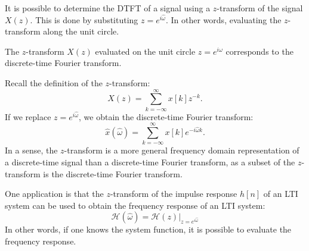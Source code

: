 It is possible to determine the DTFT of a signal using a $z$-transform
of the signal $X(z)$. This is done by substituting
$z=e^{i\hat{\omega}}$. In other words, evaluating the $z$-transform
along the unit circle.

\begin{marginfigure}
  \begin{center}
  \end{center}
  \caption{The $z$-transform $X(z)$ evaluated on the unit circle $z=e^{i\hat{\omega}}$ corresponds to the discrete-time Fourier transform. }
\end{marginfigure}

Recall the definition of the $z$-transform:
\begin{equation}
  X(z) = \sum_{k=-\infty}^{\infty} x[k] z^{-k}.
  \label{zfr}
\end{equation}
If we replace $z=e^{i\hat{\omega}}$, we obtain the discrete-time Fourier transform:
\begin{equation}
  \hat{x}(\hat{\omega}) = \sum_{k=-\infty}^{\infty} x[k] e^{-i\hat{\omega}k}.
  \label{zfr2}
\end{equation}
In a sense, the $z$-transform is a more general frequency domain
representation of a discrete-time signal than a discrete-time Fourier
transform, as a subset of the $z$-transform is the discrete-time Fourier
transform.

One application is that the $z$-transform of the impulse response $h[n]$ of
an LTI system can be used to obtain the frequency response of an LTI
system:
\begin{equation}
  \boxed{
  \mathcal{H}(\hat{\omega}) = \mathcal{H}(z)|_{z=e^{i\hat{\omega}}}
  }
\end{equation}
In other words, if one knows the system function, it is possible to evaluate the frequency response.

